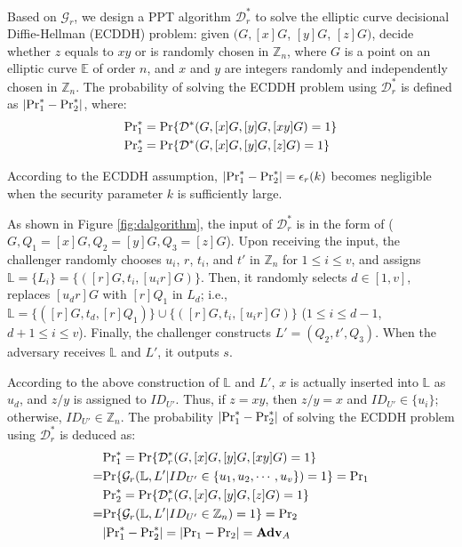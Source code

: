 {Based on $\mathcal{G}_r$, we design a PPT algorithm $\mathcal{D}^*_r$ to solve the elliptic curve decisional Diffie-Hellman (ECDDH) problem:
 given $(G, [x]G$, $[y]G$, $[z]G)$, decide whether $z$ equals to $xy$ or is randomly chosen in $\mathbb{Z}_n$,
    where $G$ is a point on an elliptic curve $\mathbb{E}$ of order $n$, and $x$ and $y$ are integers randomly and independently chosen in $\mathbb{Z}_n$.
The probability of solving the ECDDH problem using $\mathcal{D}^*_r$ is defined as $|{\rm Pr}^*_1 - {\rm Pr}^*_2|$, where:
\begin{align*}
&{\rm Pr}^*_1 =  {\rm Pr}\{\mathcal{D}^*(G, [x]G, [y]G, [xy]G)=1\} \\
&{\rm Pr}^*_2 =  {\rm Pr}\{\mathcal{D}^*(G, [x]G, [y]G, [z]G)=1\}
\end{align*}

According to the ECDDH assumption,
    $|{\rm Pr}^*_1 - {\rm Pr}^*_2| = \epsilon_{r}(k)$ becomes negligible when the security parameter $k$ is sufficiently large.

As shown in Figure \ref{fig:dalgorithm}, the input of $\mathcal{D}^*_r$ is in the form of ($G, Q_1=[x]G, Q_2=[y]G, Q_3=[z]G$).
Upon receiving the input, the challenger randomly chooses $u_i$, $r$, $t_i$, and $t'$ in $\mathbb{Z}_n$ for $1 \leq i \leq v$, and assigns $\mathbb{L} = \{{L_i}\} = \{([r]G, t_i, [u_ir]G)\}$.
Then, it randomly selects $d \in [1,v]$, replaces $[u_dr]G$ with $[r]Q_1$ in $L_d$; i.e., $\mathbb{L} = \{([r]G, t_d, [r]Q_1)\} \cup \{([r]G, t_i, [u_ir]G)\}$ ($1 \leq i \leq d-1$, $d+1 \leq i \leq v$). Finally, the challenger constructs $L' = (Q_2, t', Q_3)$. When the adversary receives $\mathbb{L}$ and $L'$, it outputs $s$.


According to the above construction of $\mathbb{L}$ and $L'$,
 $x$ is actually inserted into $\mathbb{L}$ as $u_d$, and $z/y$ is assigned to $ID_{U'}$.
Thus, if $z = xy$, then $z/y = x$ and $ID_{U'} \in \{u_i\}$; otherwise, $ID_{U'} \in \mathbb{Z}_n$.
The probability $|{\rm Pr}^*_1 - {\rm Pr}^*_2|$ of solving the ECDDH problem using $\mathcal{D}^*_r$ is deduced as:
\begin{align*}
&{\rm Pr}^*_1 =  {\rm Pr}\{\mathcal{D}^*_r(G, [x]G, [y]G, [xy]G)=1\} \\=&{\rm Pr}\{\mathcal{G}_r(\mathbb{L}, L'|ID_{U'} \in \{u_1, u_2, \cdots, u_v\})=1\} = {\rm Pr}_1 \\
&{\rm Pr}^*_2= {\rm Pr}\{\mathcal{D}^*_r(G, [x]G, [y]G, [z]G)=1\} \\=&  {\rm Pr}\{\mathcal{G}_r(\mathbb{L}, L'|ID_{U'} \in \mathbb{Z}_n)=1\} = {\rm Pr}_2\\
&|{\rm Pr}^*_1-{\rm Pr}^*_2|=|{\rm Pr}_1-{\rm Pr}_2|={\mathbf{Adv}}_{A}
\end{align*}

}
